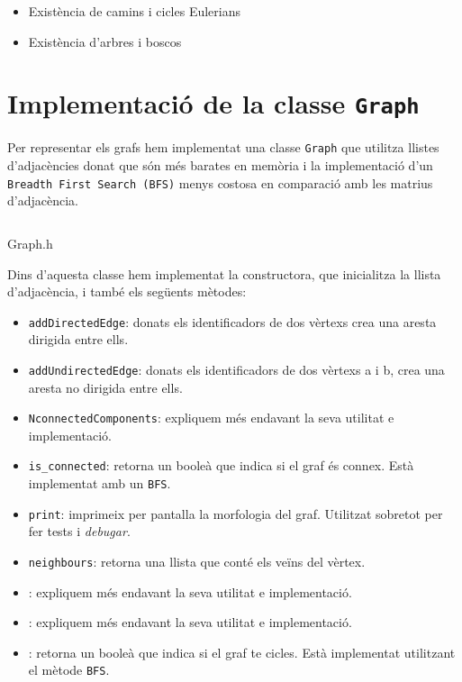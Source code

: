 \begin{itemize}
    \item Existència de camins i cicles Eulerians
    \item Existència d'arbres i boscos
\end{itemize}



\section{Implementació de la classe \texttt{Graph}}
Per representar els grafs hem implementat una classe \texttt{Graph} que utilitza llistes d'adjacències donat que són més barates en memòria i la implementació d'un \texttt{Breadth First Search (BFS)} menys costosa en comparació amb les matrius d'adjacència.

\begin{listing}
\inputminted{cpp}{src/graph.h}
\caption{Graph.h}
\end{listing}

Dins d'aquesta classe hem implementat la constructora, que inicialitza la llista d'adjacència, i també els següents mètodes:
\begin{itemize}
    \item\texttt{addDirectedEdge}: donats els identificadors de dos vèrtexs crea una aresta dirigida entre ells.
    \item\texttt{addUndirectedEdge}: donats els identificadors de dos vèrtexs a i b, crea una aresta no dirigida entre ells.
    \item\texttt{NconnectedComponents}: expliquem més endavant la seva utilitat e implementació.
    \item\texttt{is\_connected}: retorna un booleà que indica si el graf és connex. Està implementat amb un \texttt{BFS}.
    \item\texttt{print}: imprimeix per pantalla la morfologia del graf. Utilitzat sobretot per fer tests i \textit{debugar}.
    \item\texttt{neighbours}: retorna una llista que conté els veïns del vèrtex.
    \item{}: expliquem més endavant la seva utilitat e implementació.
    \item{}: expliquem més endavant la seva utilitat e implementació.
    \item{}: retorna un booleà que indica si el graf te cicles. Està implementat utilitzant el mètode \texttt{BFS}.
\end{itemize}

